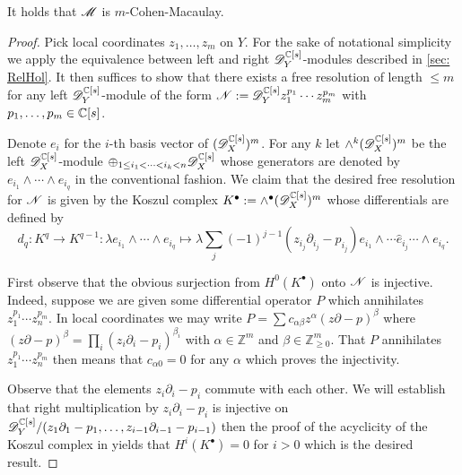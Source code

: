 \begin{proposition}\label{prop: CM}
  It holds that $\mathscr{M}$ is $m$-Cohen-Macaulay.
\end{proposition}
\begin{proof}
  Pick local coordinates $z_1,\ldots, z_m$ on $Y$.
  For the sake of notational simplicity we apply the equivalence between left and right $\mathscr{D}_Y^{\mathbb{C}[s]}$-modules described in \cref{sec: RelHol}.
  It then suffices to show that there exists a free resolution of length $\leq m$ for any left $\mathscr{D}_Y^{\mathbb{C}[s]}$-module of the form $\mathscr{N}:= \mathscr{D}_Y^{\mathbb{C}[s]}z_1^{p_1}\cdots z_m^{p_m}$ with $p_1,\ldots, p_m\in \mathbb{C}[s]$.

  Denote $e_i$ for the $i$-th basis vector of $(\mathscr{D}_X^{\mathbb{C}[s]})^m$.
  For any $k$ let $\wedge^k (\mathscr{D}_X^{\mathbb{C}[s]})^m$ be the left $\mathscr{D}_X^{\mathbb{C}[s]}$-module $\oplus_{1\leq i_1 < \cdots < i_k <n}\mathscr{D}_X^{\mathbb{C}[s]}$ whose generators are denoted by $e_{i_1}\wedge \cdots \wedge e_{i_q}$ in the conventional fashion.
  We claim that the desired free resolution for $\mathscr{N}$ is given by the Koszul complex $K^\bullet := \wedge^\bullet (\mathscr{D}_X^{\mathbb{C}[s]})^m$ whose differentials are defined by
  $$d_q :K^q \to K^{q-1}:\lambda e_{i_1}\wedge \cdots \wedge e_{i_q} \mapsto \lambda \sum_{j} (-1)^{j-1} (z_{i_j} \partial_{i_j} - p_{i_j})e_{i_1}\wedge \cdots \hat{e}_{i_j} \cdots \wedge e_{i_q}.$$

  First observe that the obvious surjection from $H^0(K^\bullet)$ onto $\mathscr{N}$ is injective.
  Indeed, suppose we are given some differential operator $P$ which annihilates $z_1^{p_1}\cdots z_n^{p_m}$.
  In local coordinates we may write $P = \sum c_{\alpha \beta} z^\alpha (z\partial - p)^\beta$ where $(z\partial - p)^\beta = \prod_i (z_i \partial_i - p_i)^{\beta_i}$ with $\alpha \in \mathbb{Z}^m$ and $\beta \in \mathbb{Z}^{m}_{\geq 0}$.
  That $P$ annihilates $z_1^{p_1}\cdots z_n^{p_m}$ then means that $c_{\alpha 0}=0$ for any $\alpha$ which proves the injectivity.

  Observe that the elements $z_i \partial_i - p_i$ commute with each other.
  We will establish that right multiplication by $z_i\partial_i - p_i$ is injective on $\mathscr{D}_Y^{\mathbb{C}[s]}/(z_1\partial_1 - p_1,\ldots, z_{i-1}\partial_{i-1} - p_{i-1} )$ then the proof of the acyclicity of the Koszul complex in \cite[Corollary 4.5.4]{weibel1995introduction} yields that $H^i(K^\bullet)= 0$ for $i>0$ which is the desired result.


\end{proof}

